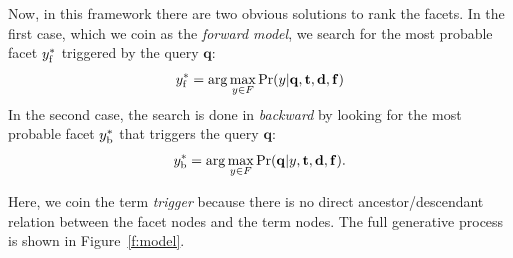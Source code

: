 Now, in this framework there are two obvious solutions to rank the facets.  In
the first case, which we coin as the \emph{forward model}, we search for the
most probable facet $y^*_{\rm f}$ triggered by the query $\mathbf{q}$:
\begin{equation}y^*_{\rm f} = \arg\max_{y \in F} \Pr(y|\mathbf{q}, \mathbf{t},
\mathbf{d}, \mathbf{f}) \label{eq:forward} \end{equation} In the second case,
the search is done in \emph{backward} by looking for the most probable facet
$y^*_{\rm b}$ that triggers the query $\mathbf{q}$:  \begin{equation}y^*_{\rm b} =
\arg\max_{y \in F} \Pr(\mathbf{q}|y, \mathbf{t}, \mathbf{d}, \mathbf{f}).
\label{eq:backward} \end{equation} 

Here, we coin the term \emph{trigger} because there is no direct
ancestor/descendant relation between the facet nodes and the term nodes.  The
full generative process is shown in Figure~\ref{f:model}.  

